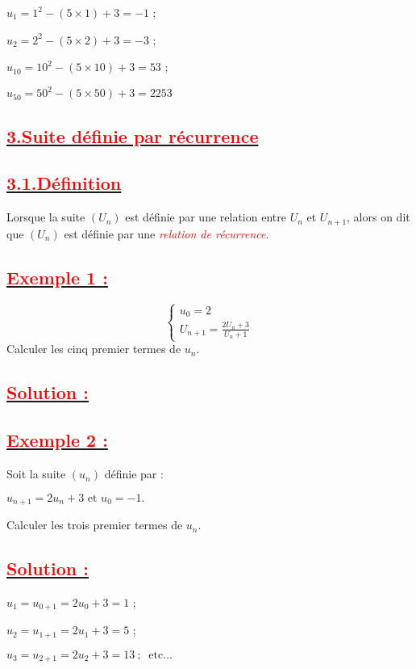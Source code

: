 \documentclass[12pt]{article}
\begin{document}
$u_{1}=1^{2}-(5\times 1)+3=-1$ ;
	
$u_{2}=2^{2}-(5\times 2)+3=-3$ ;
	
$u_{10}=10^{2}-(5\times 10)+3=53$ ;
	
$u_{50}=50^{2}-(5\times 50)+3=2253$
\subsection*{\underline{\textbf{\textcolor{red}{3.Suite définie par récurrence}}}}
\subsection*{\underline{\textbf{\textcolor{red}{3.1.Définition}}}}	
Lorsque la suite $(U_n)$ est définie par une relation entre $U_n$ et $U_{n+1}$, alors on dit que $(U_n)$ est définie par une \textcolor{red}{\textit{relation de récurrence}}.
\subsection*{\underline{\textbf{\textcolor{red}{Exemple 1 :}}}}
\begin{equation*} 
    \begin{cases}
        u_{0}=2 \\
        U_{n + 1}=\frac{2U_n + 3}{U_n + 1}
    \end{cases}
\end{equation*}
Calculer les cinq premier termes de $u_{n}$.
\subsection*{\underline{\textbf{\textcolor{red}{Solution :}}}}
\subsection*{\underline{\textbf{\textcolor{red}{Exemple 2 :}}}}
Soit la suite $\left(u_{n}\right)$ définie par :
	
$u_{n+1}=2u_{n}+3\text{ et }u_{0}=-1.$

Calculer les trois premier termes de $u_{n}$.
\subsection*{\underline{\textbf{\textcolor{red}{Solution :}}}}	
$u_{1}=u_{0+1}=2u_{0}+3=1$ ;
	
$u_{2}=u_{1+1}=2u_{1}+3=5$ ;
	
$u_{3}=u_{2+1}=2u_{2}+3=13\ ;\ \text{ etc}\ldots$
	
\end{document}
